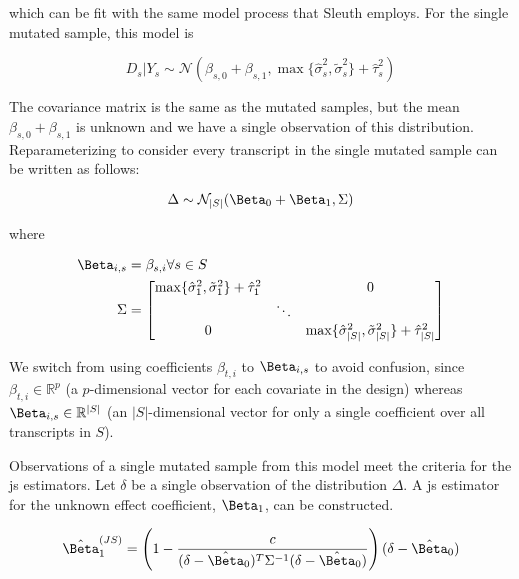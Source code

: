 which can be fit with the same model process that Sleuth employs.
For the single mutated sample, this model is

\begin{equation}
  D_s | Y_s \sim \mathcal{N} \left( \beta_{s, 0} + \beta_{s, 1}, \max\{ \hat{\sigma}_s^2, \tilde{\sigma}_s^2 \} + \hat{\tau}_s^2 \right)
  \label{eqn:single_mut_model}
\end{equation}

The covariance matrix is the same as the mutated samples, but the mean $\beta_{s, 0} + \beta_{s, 1}$ is unknown and we have a single observation of this distribution.
Reparameterizing  to consider every transcript in the single mutated sample can be written as follows:

\begin{equation}
  \Delta \sim \mathcal{N}_{|S|}(\Beta_0 + \Beta_1, \Sigma) \\
\end{equation}

where

\begin{align}
  \Beta_{i,s} &= \beta_{s,i} \forall s \in S \\
  \Sigma &= \begin{bmatrix}
    \max\{ \hat{\sigma}_1^2, \tilde{\sigma}_1^2 \} + \hat{\tau}_1^2 & & 0 \\
    & \ddots & \\
    0 & & \max\{ \hat{\sigma}_{|S|}^2, \tilde{\sigma}_{|S|}^2 \} + \hat{\tau}_{|S|}^2 \\
  \end{bmatrix}
\end{align}

We switch from using coefficients $\beta_{t,i}$ to $\Beta_{i,s}$ to avoid confusion, since $\beta_{t,i} \in \mathbb{R}^p$ (a $p$-dimensional vector for each covariate in the design) whereas $\Beta_{i,s} \in \mathbb{R}^{|S|}$ (an $|S|$-dimensional vector for only a single coefficient over all transcripts in $S$).

Observations of a single mutated sample from this model meet the criteria for the \gls{js} estimators.
Let $\delta$ be a single observation of the distribution $\Delta$.
A \gls{js} estimator for the unknown effect coefficient, $\Beta_1$, can be constructed.

\begin{equation}
  \hat{\Beta}_1^{(JS)} = \left( 1 - \frac{c}{(\delta - \hat{\Beta}_0)^T \Sigma^{-1} (\delta - \hat{\Beta}_0)} \right)(\delta - \hat{\Beta}_0)
  \label{eqn:js_defn}
\end{equation}

